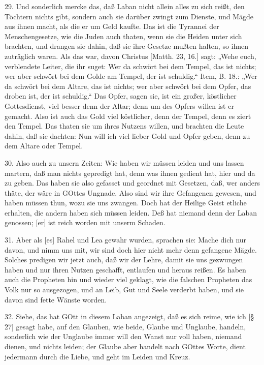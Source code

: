 29. Und sonderlich mercke das, daß Laban nicht allein alles zu sich reißt, den Töchtern nichts gibt, sondern auch sie darüber zwingt zum Dienste, und Mägde aus ihnen macht, als die er um Geld kaufte. Das ist die Tyrannei der Menschengesetze, wie die Juden auch thaten, wenn sie die Heiden unter sich brachten, und drangen sie dahin, daß sie ihre Gesetze mußten halten, so ihnen zuträglich waren. Als das war, davon Christus [Matth. 23, 16.] sagt: „Wehe euch, verblendete Leiter, die ihr suget: Wer da schwört bei dem Tempel, das ist nichts; wer aber schwört bei dem Golde am Tempel, der ist schuldig.“ Item, B. 18.: „Wer da schwört bei dem Altare, das ist nichts; wer aber schwört bei dem Opfer, das droben ist, der ist schuldig.“ Das Opfer, sagen sie, ist ein großer, köstlicher Gottesdienst, viel besser denn der Altar; denn um des Opfers willen ist er gemacht. Also ist auch das Gold viel köstlicher, denn der Tempel, denn es ziert den Tempel. Das thaten sie um ihres Nutzens willen, und brachten die Leute dahin, daß sie dachten: Nun will ich viel lieber Gold und Opfer geben, denn zu dem Altare oder Tempel.

30. Also auch zu unsern Zeiten: Wie haben wir müssen leiden und uns lassen martern, daß man nichts gepredigt hat, denn was ihnen gedient hat, hier und da zu geben. Das haben sie also gefasset und geordnet mit Gesetzen, daß, wer anders thäte, der wäre in GOttes Ungnade. Also sind wir ihre Gefangenen gewesen, und haben müssen thun, wozu sie uns zwangen. Doch hat der Heilige Geist etliche erhalten, die andern haben sich müssen leiden. Deß hat niemand denn der Laban genossen; [er] ist reich worden mit unserm Schaden.

31. Aber als [es] Rahel und Lea gewahr wurden, sprachen sie: Mache dich nur davon, und nimm uns mit, wir sind doch hier nicht mehr denn gefangene Mägde. Solches predigen wir jetzt auch, daß wir der Lehre, damit sie uns gezwungen haben und nur ihren Nutzen geschafft, entlaufen und heraus reißen. Es haben auch die Propheten hin und wieder viel geklagt, wie die falschen Propheten das Volk nur so ausgezogen, und an Leib, Gut und Seele verderbt haben, und sie davon sind fette Wänste worden.

32. Siehe, das hat GOtt in diesem Laban angezeigt, daß es sich reime, wie ich [§ 27] gesagt habe, auf den Glauben, wie beide, Glaube und Unglaube, handeln, sonderlich wie der Unglaube immer will den Wanst nur voll haben, niemand dienen, und nichts leiden; der Glaube aber handelt nach GOttes Worte, dient jedermann durch die Liebe, und geht im Leiden und Kreuz.

